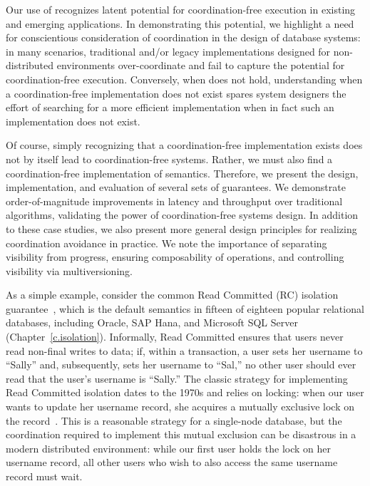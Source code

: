 Our use of \iconfluence recognizes latent potential for
coordination-free execution in existing and emerging applications. In
demonstrating this potential, we highlight a need for conscientious
consideration of coordination in the design of database systems: in
many \iconfluent scenarios, traditional and/or legacy implementations
designed for non-distributed environments over-coordinate and fail to
capture the potential for coordination-free execution. Conversely,
when \iconfluence does not hold, understanding when a
coordination-free implementation does not exist spares system
designers the effort of searching for a more efficient implementation
when in fact such an implementation does not exist.

Of course, simply recognizing that a coordination-free implementation
exists does not by itself lead to coordination-free systems. Rather,
we must also find a coordination-free implementation of \iconfluent
semantics. Therefore, we present the design, implementation, and
evaluation of several sets of \iconfluent guarantees. We demonstrate
order-of-magnitude improvements in latency and throughput over
traditional algorithms, validating the power of coordination-free
systems design. In addition to these case studies, we also present
more general design principles for realizing coordination avoidance in
practice. We note the importance of separating visibility from
progress, ensuring composability of operations, and controlling
visibility via multiversioning.

 As a simple example, consider the common Read
Committed (RC) isolation guarantee~\cite{adya}, which is the default
semantics in fifteen of eighteen popular relational databases,
including Oracle, SAP Hana, and Microsoft SQL Server
(Chapter~\ref{c.isolation}). Informally, Read Committed ensures that
users never read non-final writes to data; if, within a transaction, a
user sets her username to ``Sally'' and, subsequently, sets her
username to ``Sal,'' no other user should ever read that the user's
username is ``Sally.'' The classic strategy for implementing Read
Committed isolation dates to the 1970s and relies on locking: when our
user wants to update her username record, she acquires a mutually
exclusive lock on the record~\cite{gray-isolation}. This is a
reasonable strategy for a single-node database, but the coordination
required to implement this mutual exclusion can be disastrous in a
modern distributed environment: while our first user holds the lock on
her username record, all other users who wish to also access the same
username record must wait.


